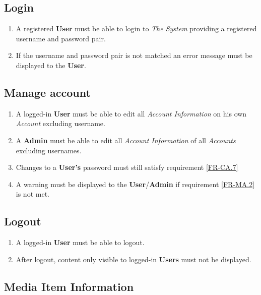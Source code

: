 \subsection {Login}
	
\begin{enumerate}[label=FR-\twodigits*, resume]
	\item A registered \textbf{User} must be able to login to \textit{The System} providing a registered username and password pair.
	\item If the username and password pair is not matched an error message must be displayed to the \textbf{User}. 
\end{enumerate}
		
\subsection {Manage account}

\begin{enumerate}[label=FR-\twodigits*, resume]
	\item A logged-in \textbf{User} must be able to edit all \textit{Account Information} on his own \textit{Account} excluding username.
	\item A \textbf{Admin} must be able to edit all \textit{Account Information} of all \textit{Accounts} excluding usernames.
	\item Changes to a \textbf{User's} password must still satisfy requirement \ref{FR-CA.7} \label{FR-MA.2}
	\item A warning must be displayed to the \textbf{User}/\textbf{Admin} if requirement \ref{FR-MA.2} is not met.	
\end{enumerate}
		
\subsection {Logout}
\begin{enumerate}[label=FR-\twodigits*, resume]
	\item A logged-in \textbf{User} must be able to logout.
	\item After logout, content only visible to logged-in \textbf{Users} must not be displayed.
\end{enumerate}
	
\subsection {Media Item Information} \label{FR-Media}

